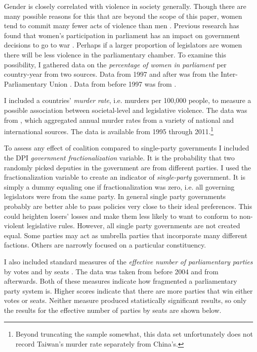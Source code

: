 \documentclass[a4paper]{article}\usepackage[]{graphicx}\usepackage[]{color}
\begin{document}
Gender is closely correlated with violence in society generally. Though there are many possible reasons for this that are beyond the scope of this paper, women tend to commit many fewer acts of violence than men \citep[see][]{Schwartz2009}. Previous research has found that women's participation in parliament has an impact on government decisions to go to war \citep{Melander2005}. Perhaps if a larger proportion of legislators are women there will be less violence in the parliamentary chamber. To examine this possibility, I gathered data on the \emph{percentage of women in parliament} per country-year from two sources. Data from 1997 and after was from the Inter-Parliamentary Union \citeyearpar{IPU2013}. Data from before 1997 was from \cite{Schwartz2009}.

I included a countries' \emph{murder rate}, i.e. murders per 100,000 people, to measure a possible association between societal-level and legislative violence. The data was from \cite{UNMurder2013}, which aggregated annual murder rates from a variety of national and international sources. The data is available from 1995 through 2011.\footnote{Beyond truncating the sample somewhat, this data set unfortunately does not record Taiwan's murder rate separately from China's.}

To assess any effect of coalition compared to single-party governments I included the DPI {\emph{government fractionalization}} variable. It is the probability that two randomly picked deputies in the government are from different parties. I used the fractionalization variable to create an indicator of {\emph{single-party}} government. It is simply a dummy equaling one if fractionalization was zero, i.e. all governing legislators were from the same party. In general single party governments probably are better able to pass policies very close to their ideal preferences. This could heighten losers' losses and make them less likely to want to conform to non-violent legislative rules. However, all single party governments are not created equal. Some parties may act as umbrella parties that incorporate many different factions. Others are narrowly focused on a particular constituency.

I also included standard measures of the \emph{effective number of parliamentary parties} by votes and by seats \citep[see][]{Laakso1979, Taagepera1989}. The data was taken from \cite{Carey2011} before 2004 and from \cite{Gallagher2012} afterwards. Both of these measures indicate how fragmented a parliamentary party system is. Higher scores indicate that there are more parties that win either votes or seats. Neither measure produced statistically significant results, so only the results for the effective number of parties by seats are shown below.
\end{document}
